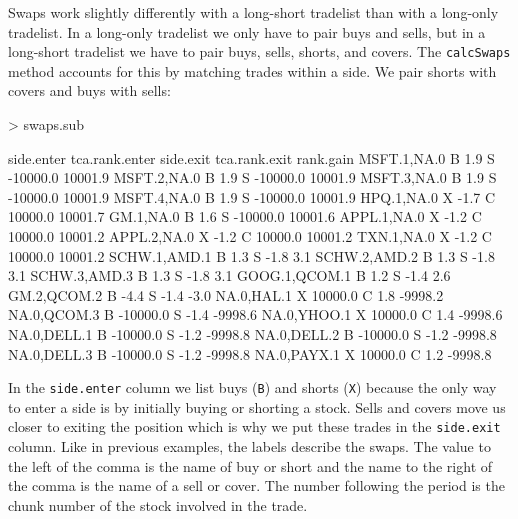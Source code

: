 \documentclass{article}
\begin{document}
Swaps work slightly differently with a long-short tradelist than with
a long-only tradelist.  In a long-only tradelist we only have to pair
buys and sells, but in a long-short tradelist we have to pair buys,
sells, shorts, and covers.  The \texttt{calcSwaps} method accounts for
this by matching trades within a side.  We pair shorts with covers and
buys with sells:


\begin{Schunk}
\begin{Sinput}
> swaps.sub
\end{Sinput}
\begin{Soutput}
              side.enter tca.rank.enter side.exit tca.rank.exit rank.gain
MSFT.1,NA.0            B            1.9         S      -10000.0   10001.9
MSFT.2,NA.0            B            1.9         S      -10000.0   10001.9
MSFT.3,NA.0            B            1.9         S      -10000.0   10001.9
MSFT.4,NA.0            B            1.9         S      -10000.0   10001.9
HPQ.1,NA.0             X           -1.7         C       10000.0   10001.7
GM.1,NA.0              B            1.6         S      -10000.0   10001.6
APPL.1,NA.0            X           -1.2         C       10000.0   10001.2
APPL.2,NA.0            X           -1.2         C       10000.0   10001.2
TXN.1,NA.0             X           -1.2         C       10000.0   10001.2
SCHW.1,AMD.1           B            1.3         S          -1.8       3.1
SCHW.2,AMD.2           B            1.3         S          -1.8       3.1
SCHW.3,AMD.3           B            1.3         S          -1.8       3.1
GOOG.1,QCOM.1          B            1.2         S          -1.4       2.6
GM.2,QCOM.2            B           -4.4         S          -1.4      -3.0
NA.0,HAL.1             X        10000.0         C           1.8   -9998.2
NA.0,QCOM.3            B       -10000.0         S          -1.4   -9998.6
NA.0,YHOO.1            X        10000.0         C           1.4   -9998.6
NA.0,DELL.1            B       -10000.0         S          -1.2   -9998.8
NA.0,DELL.2            B       -10000.0         S          -1.2   -9998.8
NA.0,DELL.3            B       -10000.0         S          -1.2   -9998.8
NA.0,PAYX.1            X        10000.0         C           1.2   -9998.8
\end{Soutput}
\end{Schunk}

In the \texttt{side.enter} column we list buys (\texttt{B}) and shorts
(\texttt{X}) because the only way to enter a side is by initially
buying or shorting a stock.  Sells and covers move us closer to
exiting the position which is why we put these trades in the
\texttt{side.exit} column.  Like in previous examples, the labels
describe the swaps.  The value to the left of the comma is the name of
buy or short and the name to the right of the comma is the name of a
sell or cover.  The number following the period is the chunk number of
the stock involved in the trade.
\end{document}
